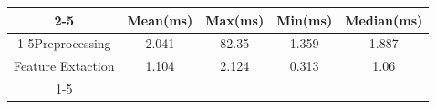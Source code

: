 \documentclass{standalone}
\begin{document}
 
 \begin{tabular}{|c |c |c |c |c |}
\cline{2-5}\cline{2-5} \multicolumn{1}{c |}{ } & Mean(ms) & Max(ms) & Min(ms) & Median(ms)\\ 
\cline{1-5}Preprocessing & 2.041 & 82.35 & 1.359 & 1.887\\ 
 \hhline{|=|=|=|=|=|}Feature Extaction & 1.104 & 2.124 & 0.313 & 1.06\\ 
 \cline{1-5}\hline \end{tabular}
 
\end{document}
